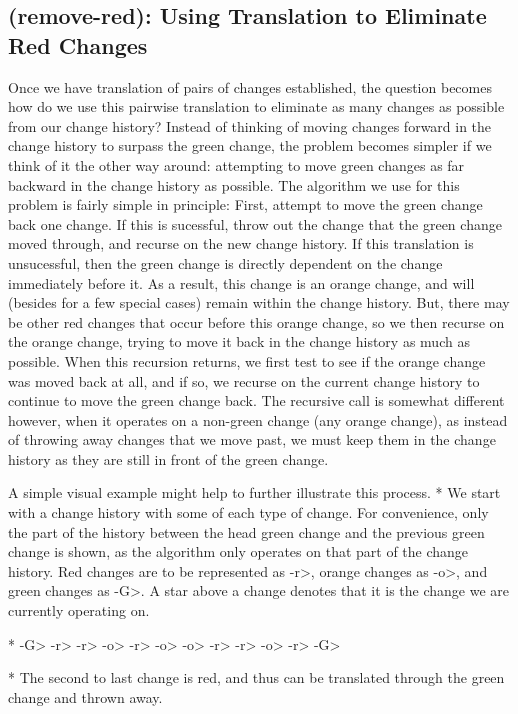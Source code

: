 \documentclass{article}
\begin{document}
\subsection{(remove-red): Using Translation to Eliminate Red Changes}

Once we have translation of pairs of changes established, 
the question becomes how do we use this pairwise translation 
to eliminate as many changes 
as possible from our change history? 
Instead of thinking of moving changes 
forward in the change history 
to surpass the green change, 
the problem becomes simpler 
if we think of it the other way around: 
attempting to move green changes 
as far backward 
in the change history as possible. 
The algorithm we use for this problem 
is fairly simple in principle: 
First, attempt to move the green change back one change. 
If this is sucessful, 
throw out the change that the green change moved through, 
and recurse on the new change history. 
If this translation is unsucessful, 
then the green change is directly dependent 
on the change immediately before it. 
As a result, 
this change is an orange change, 
and will (besides for a few special cases) 
remain within the change history. 
But, there may be other 
red changes that occur before this orange change, 
so we then recurse on the orange change, 
trying to move it back in the change history 
as much as possible. 
When this recursion returns, 
we first test to see if the orange change 
was moved back at all, 
and if so, 
we recurse on the current change history 
to continue to move the green change back. 
The recursive call is somewhat different however, 
when it operates on a non-green change (any orange change), 
as instead of throwing away changes 
that we move past, 
we must keep them in the change history 
as they are still in front of the green change.

A simple visual example 
might help to further illustrate this process.
* We start with a change history 
with some of each type of change. 
For convenience, 
only the part of the history 
between the head green change 
and the previous green change 
is shown, 
as the algorithm only operates 
on that part of the 
change history. 
Red changes are to be represented as -r>, 
orange changes as -o>, 
and green changes as -G>. 
A star above a change denotes 
that it is the change we are currently operating on.

     	   	  	 	      	     *
-G> -r> -r> -o> -r> -o> -o> -r> -r> -o> -r> -G>


* The second to last change is red, 
and thus can be translated 
through the green change 
and thrown away.
\end{document}
